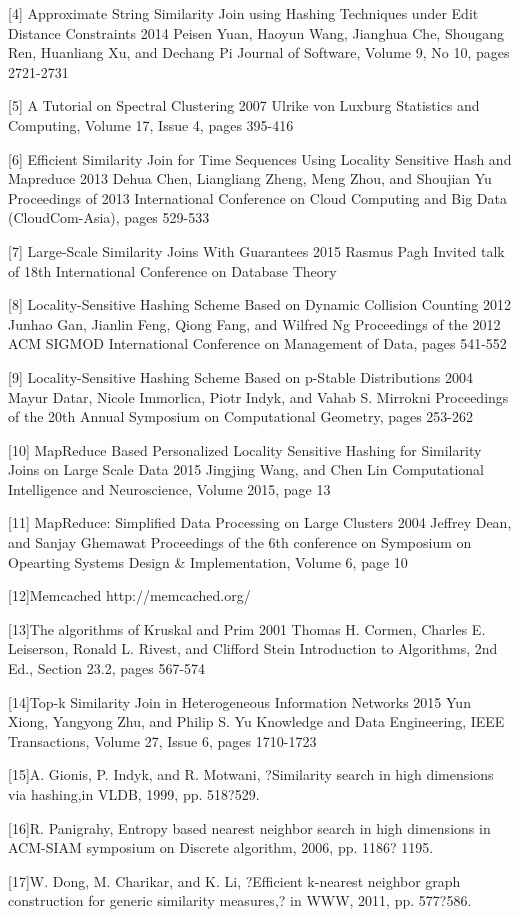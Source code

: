 \documentclass{vldb}
\begin{document}
[4] Approximate String Similarity Join using Hashing Techniques under Edit Distance Constraints 2014 Peisen Yuan, Haoyun Wang, Jianghua Che, Shougang Ren, Huanliang Xu, and Dechang Pi
Journal of Software, Volume 9, No 10, pages 2721-2731

[5] A Tutorial on Spectral Clustering 2007 Ulrike von Luxburg Statistics and Computing, Volume 17, Issue 4, pages 395-416

[6] Efficient Similarity Join for Time Sequences Using Locality Sensitive Hash and Mapreduce 2013 Dehua Chen, Liangliang Zheng, Meng Zhou, and Shoujian Yu Proceedings of 2013 International Conference on Cloud Computing and Big Data (CloudCom-Asia), pages 529-533


[7] Large-Scale Similarity Joins With Guarantees 2015 Rasmus Pagh Invited talk of 18th International Conference on Database Theory

[8] Locality-Sensitive Hashing Scheme Based on Dynamic Collision Counting 2012 Junhao Gan, Jianlin Feng, Qiong Fang, and Wilfred Ng Proceedings of the 2012 ACM SIGMOD International Conference on Management of Data, pages 541-552

[9] Locality-Sensitive Hashing Scheme Based on p-Stable Distributions 2004 Mayur Datar, Nicole Immorlica, Piotr Indyk, and Vahab S. Mirrokni Proceedings of the 20th Annual Symposium on Computational Geometry, pages 253-262

[10] MapReduce Based Personalized Locality Sensitive Hashing for Similarity Joins on Large Scale Data 2015 Jingjing Wang, and Chen Lin Computational Intelligence and Neuroscience, Volume 2015, page 13

[11] MapReduce: Simplified Data Processing on Large Clusters 2004 Jeffrey Dean, and Sanjay Ghemawat Proceedings of the 6th conference on Symposium on Opearting Systems Design \& Implementation, Volume 6, page 10

[12]Memcached http://memcached.org/

[13]The algorithms of Kruskal and Prim 2001 Thomas H. Cormen, Charles E. Leiserson, Ronald L. Rivest, and Clifford Stein Introduction to Algorithms, 2nd Ed., Section 23.2, pages 567-574

[14]Top-k Similarity Join in Heterogeneous Information Networks 2015 Yun Xiong, Yangyong Zhu, and Philip S. Yu Knowledge and Data Engineering, IEEE Transactions, Volume 27, Issue 6, pages 1710-1723

[15]A. Gionis, P. Indyk, and R. Motwani, ?Similarity search in high dimensions via hashing,in VLDB, 1999, pp. 518?529.

[16]R. Panigrahy, Entropy based nearest neighbor search in high dimensions in ACM-SIAM symposium on Discrete algorithm, 2006, pp. 1186? 1195.

[17]W. Dong, M. Charikar, and K. Li, ?Efficient k-nearest neighbor graph construction for generic similarity measures,? in WWW, 2011, pp. 577?586.
\end{document}
